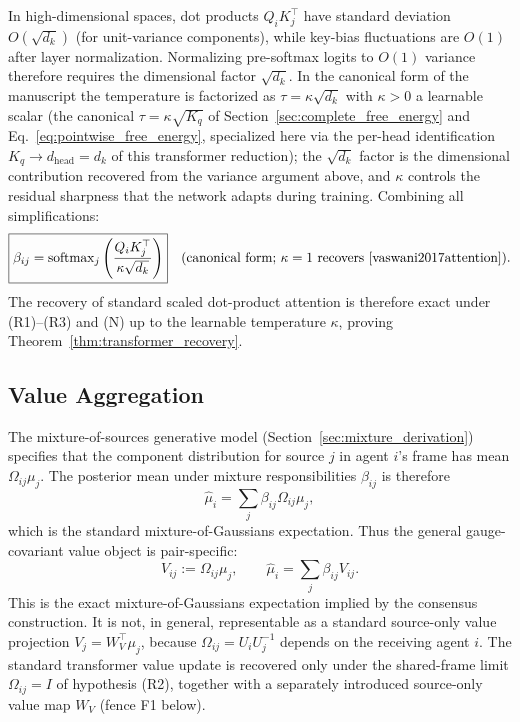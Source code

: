 \documentclass[11pt]{article}
\begin{document}
In high-dimensional spaces, dot products $Q_iK_j^\top$ have standard deviation $O(\sqrt{d_k})$ (for unit-variance components), while key-bias fluctuations are $O(1)$ after layer normalization. Normalizing pre-softmax logits to $O(1)$ variance therefore requires the dimensional factor $\sqrt{d_k}$. In the canonical form of the manuscript the temperature is factorized as $\tau = \kappa\sqrt{d_k}$ with $\kappa > 0$ a learnable scalar (the canonical $\tau = \kappa\sqrt{K_q}$ of Section~\ref{sec:complete_free_energy} and Eq.~\eqref{eq:pointwise_free_energy}, specialized here via the per-head identification $K_q \to d_{\mathrm{head}} = d_k$ of this transformer reduction); the $\sqrt{d_k}$ factor is the dimensional contribution recovered from the variance argument above, and $\kappa$ controls the residual sharpness that the network adapts during training. Combining all simplifications:
\begin{equation}
\boxed{\beta_{ij} = \mathrm{softmax}_j\left(\frac{Q_i K_j^\top}{\kappa\sqrt{d_k}}\right)}\quad\text{(canonical form; }\kappa=1\text{ recovers~\cite{vaswani2017attention}).}
\end{equation}
The recovery of standard scaled dot-product attention is therefore exact under (R1)--(R3) and (N) up to the learnable temperature $\kappa$, proving Theorem~\ref{thm:transformer_recovery}.

\subsection{Value Aggregation}\label{sec:value_aggregation_itfb}

The mixture-of-sources generative model (Section~\ref{sec:mixture_derivation}) specifies that the component distribution for source $j$ in agent $i$'s frame has mean $\Omega_{ij}\mu_j$. The posterior mean under mixture responsibilities $\beta_{ij}$ is therefore
\begin{equation}
\hat\mu_i = \sum_j \beta_{ij} \Omega_{ij}\mu_j,
\label{eq:glk_mixture_aggregation_itfb}
\end{equation}
which is the standard mixture-of-Gaussians expectation. Thus the general gauge-covariant value object is pair-specific:
\begin{equation}
V_{ij} := \Omega_{ij}\mu_j,
\qquad
\hat\mu_i = \sum_j \beta_{ij}V_{ij}.
\end{equation}
This is the exact mixture-of-Gaussians expectation implied by the consensus construction. It is not, in general, representable as a standard source-only value projection $V_j=W_V^\top\mu_j$, because $\Omega_{ij}=U_iU_j^{-1}$ depends on the receiving agent $i$. The standard transformer value update is recovered only under the shared-frame limit $\Omega_{ij}=I$ of hypothesis (R2), together with a separately introduced source-only value map $W_V$ (fence F1 below).
\end{document}
